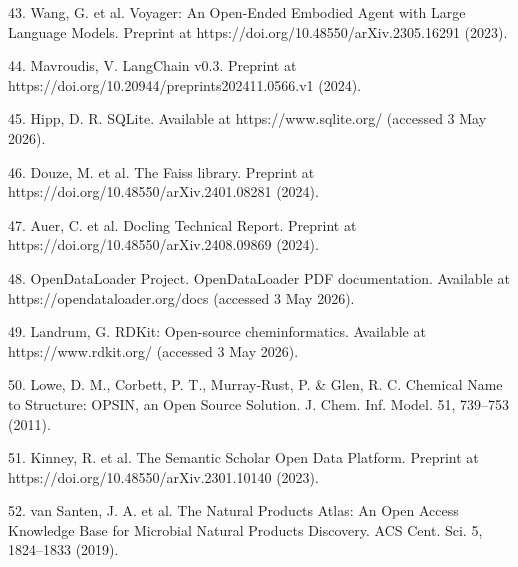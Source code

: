 \documentclass[
]{article}
\begin{document}
43. Wang, G. et al. Voyager: An Open-Ended Embodied Agent with Large
Language Models. Preprint at https://doi.org/10.48550/arXiv.2305.16291
(2023).

44. Mavroudis, V. LangChain v0.3. Preprint at
https://doi.org/10.20944/preprints202411.0566.v1 (2024).

45. Hipp, D. R. SQLite. Available at https://www.sqlite.org/ (accessed
3 May 2026).

46. Douze, M. et al. The Faiss library. Preprint at
https://doi.org/10.48550/arXiv.2401.08281 (2024).

47. Auer, C. et al. Docling Technical Report. Preprint at
https://doi.org/10.48550/arXiv.2408.09869 (2024).

48. OpenDataLoader Project. OpenDataLoader PDF documentation. Available
at https://opendataloader.org/docs (accessed 3 May 2026).

49. Landrum, G. RDKit: Open-source cheminformatics. Available at
https://www.rdkit.org/ (accessed 3 May 2026).

50. Lowe, D. M., Corbett, P. T., Murray-Rust, P. \& Glen, R. C.
Chemical Name to Structure: OPSIN, an Open Source Solution. J. Chem.
Inf. Model. 51, 739--753 (2011).

51. Kinney, R. et al. The Semantic Scholar Open Data Platform. Preprint
at https://doi.org/10.48550/arXiv.2301.10140 (2023).

52. van Santen, J. A. et al. The Natural Products Atlas: An Open Access
Knowledge Base for Microbial Natural Products Discovery. ACS Cent. Sci.
5, 1824--1833 (2019).
\end{document}
